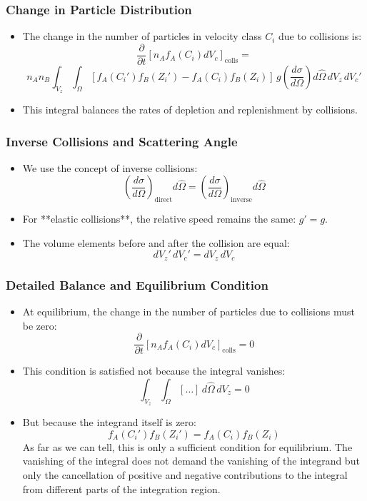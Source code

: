 \documentclass{beamer}
\begin{document}
\begin{frame}
\frametitle{Change in Particle Distribution}
\begin{itemize}
    \item The change in the number of particles in velocity class \( C_i \) due to collisions is:
    \[
    \frac{\partial}{\partial t} \left[ n_A f_A(C_i) dV_c \right]_{\text{colls}} = 
    \]
    \[
    n_A n_B \int_{V_z} \int_{\Omega} \left[ f_A(C_i') f_B(Z_i') - f_A(C_i) f_B(Z_i) \right] \, g \left( \frac{d\sigma}{d\Omega} \right) d\hat{\Omega} \, dV_z \, dV_c'
    \]
    \item This integral balances the rates of depletion and replenishment by collisions.
\end{itemize}
\end{frame}

\begin{frame}
\frametitle{Inverse Collisions and Scattering Angle}
\begin{itemize}
    \item We use the concept of inverse collisions:
    \[
    \left( \frac{d\sigma}{d\Omega} \right)_{\text{direct}} d\hat{\Omega} = \left( \frac{d\sigma}{d\Omega} \right)_{\text{inverse}} d\hat{\Omega}
    \]
    \item For **elastic collisions**, the relative speed remains the same: \( g' = g \).
    \item The volume elements before and after the collision are equal:
    \[
    dV_z' \, dV_c' = dV_z \, dV_c
    \]
\end{itemize}
\end{frame}

\begin{frame}
\frametitle{Detailed Balance and Equilibrium Condition}
\begin{itemize}
    \item At equilibrium, the change in the number of particles due to collisions must be zero:
    \[
    \frac{\partial}{\partial t} \left[ n_A f_A(C_i) dV_c \right]_{\text{colls}} = 0
    \]
    \item This condition is satisfied not because the integral vanishes:
    \[
    \int_{V_z} \int_{\Omega} [ \dots ] \, d\hat{\Omega} \, dV_z = 0
    \]
    \item But because the integrand itself is zero:
    \[
    f_A(C_i') f_B(Z_i') = f_A(C_i) f_B(Z_i)
    \]
    As far as we can tell, this is only a sufficient condition for equilibrium. The vanishing of the integral does not demand the vanishing of the integrand but only the cancellation of positive and negative contributions to the integral from different parts of the integration region.
\end{itemize}
\end{frame}
\end{document}
